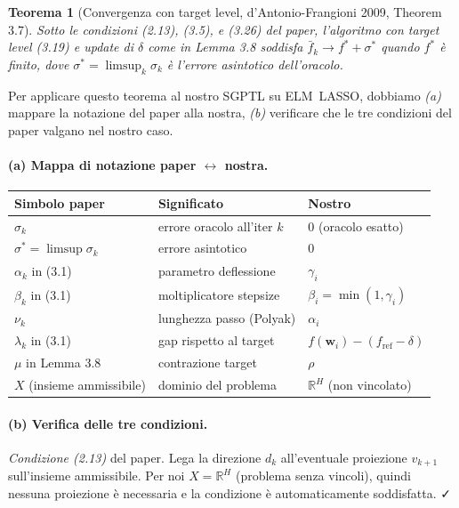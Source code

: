 \documentclass[11pt,a4paper]{article}
\newcommand{\R}{\mathbb{R}}
\newcommand{\bw}{\mathbf{w}}
\newtheorem{theorem}{Teorema}[section]
\theoremstyle{definition}
\begin{document}
\begin{theorem}[Convergenza con target level, d'Antonio-Frangioni 2009, Theorem 3.7]
\label{thm:tl-convergence}
Sotto le condizioni (2.13), (3.5), e (3.26) del paper, l'algoritmo con target level (3.19) e update di $\delta$ come in Lemma 3.8 soddisfa $\bar f_k \to f^* + \sigma^*$ quando $f^*$ è finito, dove $\sigma^* = \limsup_k \sigma_k$ è l'errore asintotico dell'oracolo.
\end{theorem}

Per applicare questo teorema al nostro SGPTL su ELM~LASSO, dobbiamo \emph{(a)} mappare la notazione del paper alla nostra, \emph{(b)} verificare che le tre condizioni del paper valgano nel nostro caso.

\paragraph{(a) Mappa di notazione paper $\leftrightarrow$ nostra.}

\begin{center}\small
\begin{tabular}{lll}
\toprule
\textbf{Simbolo paper} & \textbf{Significato} & \textbf{Nostro} \\
\midrule
$\sigma_k$ & errore oracolo all'iter $k$ & $0$ (oracolo esatto) \\
$\sigma^* = \limsup \sigma_k$ & errore asintotico & $0$ \\
$\alpha_k$ in (3.1) & parametro deflessione & $\gamma_i$ \\
$\beta_k$ in (3.1) & moltiplicatore stepsize & $\beta_i = \min(1,\gamma_i)$ \\
$\nu_k$ & lunghezza passo (Polyak) & $\alpha_i$ \\
$\lambda_k$ in (3.1) & gap rispetto al target & $f(\bw_i) - (f_{\mathrm{ref}}-\delta)$ \\
$\mu$ in Lemma 3.8 & contrazione target & $\rho$ \\
$X$ (insieme ammissibile) & dominio del problema & $\R^H$ (non vincolato) \\
\bottomrule
\end{tabular}
\end{center}

\paragraph{(b) Verifica delle tre condizioni.}

\emph{Condizione (2.13)} del paper. Lega la direzione $d_k$ all'eventuale proiezione $v_{k+1}$ sull'insieme ammissibile. Per noi $X = \R^H$ (problema senza vincoli), quindi nessuna proiezione è necessaria e la condizione è automaticamente soddisfatta. ✓
\end{document}
